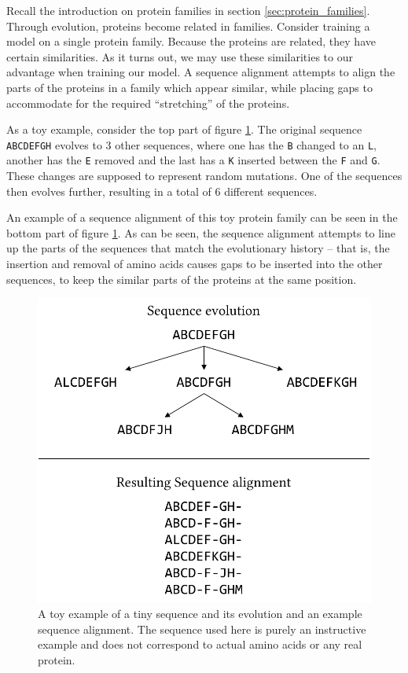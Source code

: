 Recall the introduction on protein families in section \ref{sec:protein_families}. Through evolution, proteins become related in families. Consider training a model on a single protein family. Because the proteins are related, they have certain similarities. As it turns out, we may use these similarities to our advantage when training our model. A sequence alignment attempts to align the parts of the proteins in a family which appear similar, while placing gaps to accommodate for the required ``stretching'' of the proteins.

As a toy example, consider the top part of figure \ref{fig:sequence_alignment_toy_example}. The original sequence \texttt{ABCDEFGH} evolves to 3 other sequences, where one has the \texttt{B} changed to an \texttt{L}, another has the \texttt{E} removed and the last has a \texttt{K} inserted between the \texttt{F} and \texttt{G}. These changes are supposed to represent random mutations. One of the sequences then evolves further, resulting in a total of 6 different sequences.

An example of a sequence alignment of this toy protein family can be seen in the bottom part of figure \ref{fig:sequence_alignment_toy_example}. As can be seen, the sequence alignment attempts to line up the parts of the sequences that match the evolutionary history -- that is, the insertion and removal of amino acids causes gaps to be inserted into the other sequences, to keep the similar parts of the proteins at the same position.

\begin{figure}[ht]
    \centering
    \includegraphics[scale = 0.9]{report/figures/sequence_alignments.pdf}
    \caption{A toy example of a tiny sequence and its evolution and an example sequence alignment. The sequence used here is purely an instructive example and does not correspond to actual amino acids or any real protein.}
    \label{fig:sequence_alignment_toy_example}
\end{figure}

